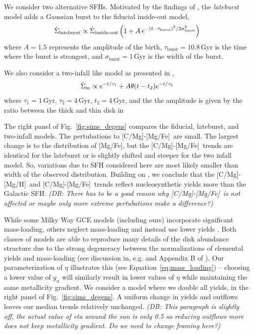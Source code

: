 \documentclass[fleqn,
usenatbib]{mnras}
\newcommand{\JJ}{\citetalias{james+21}}
\newcommand{\gce}{GCE}
\newcommand{\caah}{[C/Mg]-[Mg/H]}
\newcommand{\caafe}{[C/Mg]-[Mg/Fe]}
\newcommand{\dbnote}[1]{ {\color{Thistle} \textit{\small (DB: #1)}} }
\begin{document}
We consider two alternative SFHs. 
Motivated by the findings of \citet[see discussion in \JJ]{mor+19,isern19}, the \textit{lateburst} model
adds a Gaussian burst to the fiducial inside-out model, 
\begin{equation}\label{eq:lateburst}
    \dot{\Sigma}_\text{lateburst} \propto \dot{\Sigma}_\text{inside-out} \left(1 + A\,e^{-(t-\tau_{\rm burst})^2/2\sigma^2_{\rm burst}} \right)
\end{equation}
where $A=1.5$ represents the amplitude of the birth, $\tau_\text{burst}=10.8$\,Gyr is the time where the burst is strongest, and $\sigma_\text{burst}=1$\,Gyr is the width of the burst.

We also consider a two-infall like model as presented in \citep{dubay+24},
\begin{equation}\label{twoinfall}
\dot{\Sigma}_{\rm in} \propto e^{-t/\tau_1} + A \theta(t - t_{2}) e^{-t/\tau_2}
\end{equation}
where $\tau_1=1\,$Gyr, $\tau_2=4\,$Gyr, $t_2=4$\,Gyr, and the the amplitude is given by the ratio between the thick and thin disk in  

The right panel of Fig.~\ref{fig:sims_degens} compares the fiducial, lateburst, and two-infall models. The pertubations to \caafe\ are small. The largest change is to the distribution of [Mg/Fe], but the \caafe\ trends are identical for the lateburst or is slightly shifted and steeper for the two infall model. So, variations due to SFH considered here are most likely smaller than width of the observed distribution.
Building on \citet{james+23}, we conclude that the \caah\ and \caafe\ trends reflect nucleosynthetic yields more than the Galactic SFH. 
\dbnote{There has to be a good reason why \caafe\ is not affected or maybe only more extreme pertubations make a difference?}



While some Milky Way \gce{} models (including ours) incorporate significant mass-loading, others
neglect mass-loading and instead use lower yields \citep[e.g.][]{MCM13, MCM14, spitoni19, spitoni20, spitoni21}.
Both classes of models are able to reproduce many details of the disk abundance structure due to the strong degeneracy between the normalizations of elemental yields and mass-loading (see discussion in, e.g. \citealt{sandford+24} and Appendix B of \citealt{james+23}). 
Our parameterization of $\eta$ illustrates this (see Equation~\ref{eq:mass_loading}) -- choosing a lower value of $y_{\alpha}$ will similarly result in lower values of $\eta$ while maintaining the same metallicity gradient. 
We consider a model where we double all yields, in the right panel of Fig.~\ref{fig:sims_degens}. A uniform change in yields and outflows leaves our median trends relatively unchanged. 
\dbnote{This paragraph is slightly off, the actual value of eta around the sun is only 0.5 so reducing outflows more does not keep metallicity gradient. Do we need to change framing here?}
\end{document}
